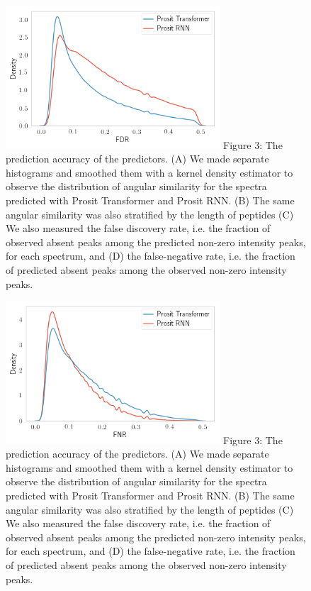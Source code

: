 \documentclass[10pt,a4paper]{article}
\begin{document}
\begin{figure}[htb]
\includegraphics[width=8cm]{./figures/FDR.png}
Figure 3: The prediction accuracy of the predictors. (A) We made separate histograms and smoothed them with a kernel density estimator to observe the distribution of angular similarity for the spectra predicted with Prosit Transformer and Prosit RNN. (B) The same angular similarity was also stratified by the length of peptides (C) We also measured the false discovery rate, i.e. the fraction of observed absent peaks among the predicted non-zero intensity peaks, for each spectrum, and (D) the false-negative rate, i.e. the fraction of predicted absent peaks among the observed non-zero intensity peaks.
\end{figure}
\begin{figure}[htb]
\includegraphics[width=8cm]{./figures/FNR.png}
Figure 3: The prediction accuracy of the predictors. (A) We made separate histograms and smoothed them with a kernel density estimator to observe the distribution of angular similarity for the spectra predicted with Prosit Transformer and Prosit RNN. (B) The same angular similarity was also stratified by the length of peptides (C) We also measured the false discovery rate, i.e. the fraction of observed absent peaks among the predicted non-zero intensity peaks, for each spectrum, and (D) the false-negative rate, i.e. the fraction of predicted absent peaks among the observed non-zero intensity peaks.
\end{figure}
\end{document}
